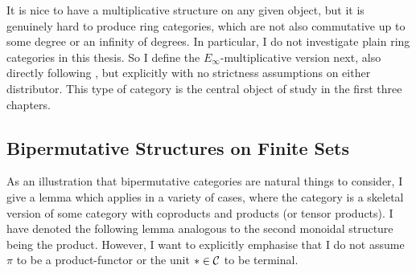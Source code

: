 It is nice to have a multiplicative structure on any given object, but
it is genuinely hard to produce ring categories, which are not also 
commutative up to some degree or an infinity of degrees. In particular,
I do not investigate plain ring categories in this thesis. So I define 
the $E_\infty$-multiplicative version next, also directly following 
\cite{MayEinf,EM}, but explicitly with no strictness assumptions on
either distributor. This type of category is the central object of study
in the first three chapters.

{}

{}

\subsection{Bipermutative Structures on Finite Sets}
As an illustration that bipermutative categories are natural 
things to consider, I give a lemma which applies in a variety of 
cases, where the category is a skeletal version of some category 
with coproducts and products (or tensor products). I have denoted the
following lemma analogous to the second monoidal structure being the
product. However, I want to explicitly emphasise that I do not assume
$\pi$ to be a product-functor or the unit $*\in\mathcal{C}$ to be terminal.


